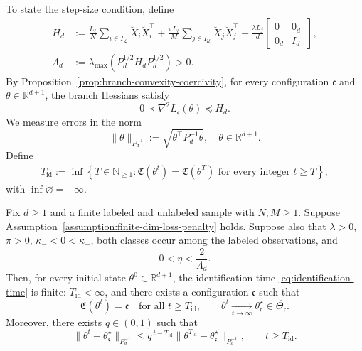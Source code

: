 To state the step-size condition, define
\begin{align}
    H_d
    &:=
    \frac{L_\ell}{N}\sum_{i\in I_{\mathcal L}}
        \breve X_i\breve X_i^\top
    +
    \frac{\pi L_\ell}{M}\sum_{j\in I_{\mathcal U}}
        \breve X_j\breve X_j^\top
    +
    \frac{\lambda L_j}{d}
    \begin{bmatrix}
        0 & 0_d^\top\\
        0_d & I_d
    \end{bmatrix}, \label{eq:hessian} \\
    \Lambda_d
    &:=
    \lambda_{\max}(P_d^{1/2}H_dP_d^{1/2})>0. \label{eq:lambda-d}
\end{align}
By Proposition~\ref{prop:branch-convexity-coercivity},
for every configuration $\mathfrak c$ and
$\theta\in\mathbb R^{d+1}$, the branch Hessians satisfy
\[
    0\prec\nabla^2L_{\mathfrak c}(\theta)\preceq H_d.
\]
We measure errors in the norm
\[
    \|\theta\|_{P_d^{-1}}
    :=
    \sqrt{\theta^\top P_d^{-1}\theta}, \quad \theta \in \mathbb{R}^{d+1}.
\]
Define
\begin{align}
    T_{\mathrm{id}}
    :=
    \inf\left\{
        T\in\mathbb N_{\geq1}:
        \mathfrak C(\theta^t)=\mathfrak C(\theta^T)
        \text{ for every integer }t\geq T
    \right\}, \label{eq:identification-time}
\end{align}
with $\inf\varnothing=+\infty$.

\begin{theorem}
\label{thm:st-convergence}
Fix $d\geq1$ and a finite labeled and unlabeled sample with
$N,M\geq1$. Suppose
Assumption~\ref{assumption:finite-dim-loss-penalty} holds.
Suppose also that $\lambda>0$, $\pi>0$, $\kappa_-<0<\kappa_+$,
both classes occur among the labeled observations, and
\begin{equation}
    0<\eta<\frac{2}{\Lambda_d}.
    \label{eq:st-descent-step-size}
\end{equation}
Then, for every initial state $\theta^0\in\mathbb R^{d+1}$,
the identification time \eqref{eq:identification-time} is finite: $T_{\mathrm{id}} < \infty$, and there exists
a configuration $\mathfrak c$ such that
\[
    \mathfrak C(\theta^t)=\mathfrak c
    \quad\text{for all }t\geq T_{\mathrm{id}},
    \qquad
    \theta^t\xrightarrow[t\to\infty]{}
    \theta_{\mathfrak c}^\star
    \in\overline{\Theta_{\mathfrak c}}.
\]
Moreover, there exists $q\in(0,1)$ such that
\[
    \|\theta^t-\theta_{\mathfrak c}^\star\|_{P_d^{-1}}
    \leq
    q^{\,t-T_{\mathrm{id}}}
    \|\theta^{T_{\mathrm{id}}}-\theta_{\mathfrak c}^\star\|_{P_d^{-1}},
    \qquad t\geq T_{\mathrm{id}}.
\]
\end{theorem}

